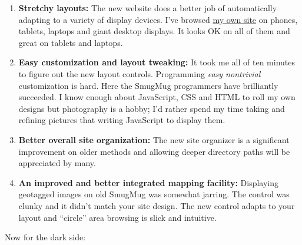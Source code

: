 \begin{enumerate}
\item
  \textbf{Stretchy layouts:} The new website does a better job of
  automatically adapting to a variety of display devices. I've browsed
  \href{http://conceptcontrol.smugmug.com/}{my own site} on phones,
  tablets, laptops and giant desktop displays. It looks OK on all of
  them and great on tablets and laptops.
\item
  \textbf{Easy customization and layout tweaking:} It took me all of ten
  minutes to figure out the new layout controls. Programming \emph{easy
  nontrivial} customization is hard. Here the SmugMug programmers have
  brilliantly succeeded. I know enough about JavaScript, CSS and HTML to
  roll my own designs but photography is a hobby; I'd rather spend my
  time taking and refining pictures that writing JavaScript to display
  them.
\item
  \textbf{Better overall site organization:} The new site organizer is a
  significant improvement on older methods and allowing deeper directory
  paths will be appreciated by many.
\item
  \textbf{An improved and better integrated mapping facility:}
  Displaying geotagged images on old SmugMug was somewhat jarring. The
  control was clunky and it didn't match your site design. The new
  control adapts to your layout and ``circle'' area browsing is slick
  and intuitive.
\end{enumerate}

Now for the dark side:

